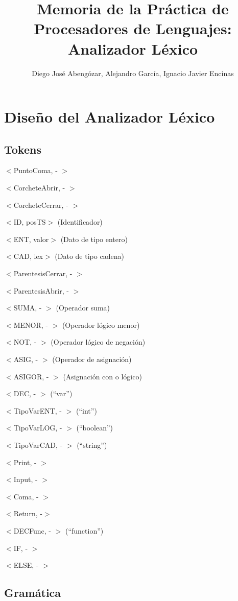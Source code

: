 \documentclass[a4paper, 12pt]{article}
\title{Memoria de la Práctica de Procesadores de Lenguajes: Analizador Léxico}
\author{Diego José Abengózar, Alejandro García, Ignacio Javier Encinas}
\begin{document}
\maketitle
\tableofcontents
\newpage

\section{Diseño del Analizador Léxico}

\subsection{Tokens}
\indent

$<$PuntoComa, - $>$

$<$CorcheteAbrir, - $>$ 

$<$CorcheteCerrar, - $>$

$<$ID, posTS$>$ (Identificador)

$<$ENT, valor$>$ (Dato de tipo entero)

$<$CAD, lex$>$ (Dato de tipo cadena)

$<$ParentesisCerrar, - $>$

$<$ParentesisAbrir, - $>$

$<$SUMA, - $>$ (Operador suma)

$<$MENOR, - $>$ (Operador lógico menor)

$<$NOT, - $>$ (Operador lógico de negación)

$<$ASIG, - $>$ (Operador de asignación)

$<$ASIGOR, - $>$ (Asignación con o lógico)

$<$DEC, - $>$ (“var”)

$<$TipoVarENT, - $>$ (“int”)

$<$TipoVarLOG, - $>$ (“boolean”)

$<$TipoVarCAD, - $>$ (“string”)

$<$Print, - $>$

$<$Input, - $>$

$<$Coma, - $>$

$<$Return, -$>$

$<$DECFunc, - $>$ (“function”)

$<$IF, - $>$

$<$ELSE, - $>$
\subsection{Gramática}
\end{document}
